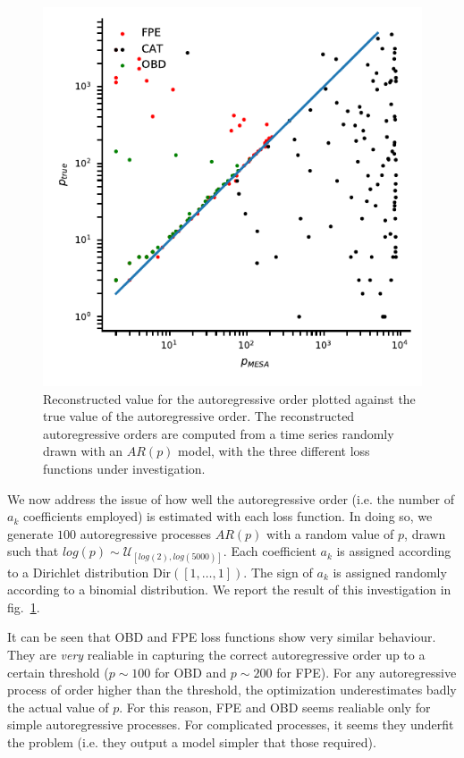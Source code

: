 \documentclass[twocolumn,showpacs,preprintnumbers,nofootinbib,prd,
superscriptaddress,10pt]{revtex4-1}
\begin{document}
\begin{figure}
	\centering
	\includegraphics[width = \linewidth]{Images/arp_errors/scatter_deltap_ptrue}
	\caption{Reconstructed value for the autoregressive order plotted against the true value of the autoregressive order.
	The reconstructed autoregressive orders are computed from a time series randomly drawn with an $AR(p)$ model, with the three different loss functions under investigation.
	}
	\label{fig:p_vs_ptrue}
\end{figure}

We now address the issue of how well the autoregressive order (i.e. the number of $a_k$ coefficients employed) is estimated with each loss function.
In doing so, we generate $100$ autoregressive processes $AR(p)$ with a random value of $p$, drawn such that $log(p) \sim\mathcal{U}_{[log(2), log(5000)]}$.
Each coefficient $a_k$ is assigned according to a Dirichlet distribution $\mathrm{Dir}([1,\hdots, 1])$. The sign of $a_k$ is assigned randomly according to a binomial distribution.
We report the result of this investigation in fig.~\ref{fig:p_vs_ptrue}.

It can be seen that OBD and FPE loss functions show very similar behaviour. They are {\it very} realiable in capturing the correct autoregressive order up to a certain threshold ($p\sim 100$ for OBD and $p\sim 200$ for FPE). For any autoregressive process of order higher than the threshold, the optimization underestimates badly the actual value of $p$.
For this reason, FPE and OBD seems realiable only for simple autoregressive processes. For complicated processes, it seems they underfit the problem (i.e. they output a model simpler that those required).
\end{document}
